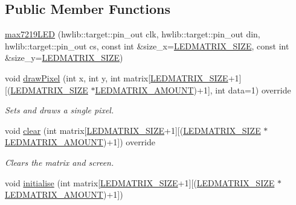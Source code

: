 \subsection*{Public Member Functions}
\begin{DoxyCompactItemize}
\item 
\hyperlink{classmax7219_l_e_d_a3f13dbd1dd54e3d3ce0148c1119273e5}{max7219\+L\+ED} (hwlib\+::target\+::pin\+\_\+out clk, hwlib\+::target\+::pin\+\_\+out din, hwlib\+::target\+::pin\+\_\+out cs, const int \&size\+\_\+x=\hyperlink{max7219_l_e_dconstants_8hpp_a2a4cf20d00f170bb1778318f645ab6cb}{L\+E\+D\+M\+A\+T\+R\+I\+X\+\_\+\+S\+I\+ZE}, const int \&size\+\_\+y=\hyperlink{max7219_l_e_dconstants_8hpp_a2a4cf20d00f170bb1778318f645ab6cb}{L\+E\+D\+M\+A\+T\+R\+I\+X\+\_\+\+S\+I\+ZE})
\item 
void \hyperlink{classmax7219_l_e_d_a6ce14869c58cf742e39e16620a4a724f}{draw\+Pixel} (int x, int y, int matrix\mbox{[}\hyperlink{max7219_l_e_dconstants_8hpp_a2a4cf20d00f170bb1778318f645ab6cb}{L\+E\+D\+M\+A\+T\+R\+I\+X\+\_\+\+S\+I\+ZE}+1\mbox{]}\mbox{[}(\hyperlink{max7219_l_e_dconstants_8hpp_a2a4cf20d00f170bb1778318f645ab6cb}{L\+E\+D\+M\+A\+T\+R\+I\+X\+\_\+\+S\+I\+ZE} $\ast$\hyperlink{max7219_l_e_dconstants_8hpp_aa3f1c3f51823e34beb0682e7f799793b}{L\+E\+D\+M\+A\+T\+R\+I\+X\+\_\+\+A\+M\+O\+U\+NT})+1\mbox{]}, int data=1) override
\begin{DoxyCompactList}\small\item\em Sets and draws a single pixel. \end{DoxyCompactList}\item 
void \hyperlink{classmax7219_l_e_d_a5ea755271f6306d1f0e97ec1f7c2c7c0}{clear} (int matrix\mbox{[}\hyperlink{max7219_l_e_dconstants_8hpp_a2a4cf20d00f170bb1778318f645ab6cb}{L\+E\+D\+M\+A\+T\+R\+I\+X\+\_\+\+S\+I\+ZE}+1\mbox{]}\mbox{[}(\hyperlink{max7219_l_e_dconstants_8hpp_a2a4cf20d00f170bb1778318f645ab6cb}{L\+E\+D\+M\+A\+T\+R\+I\+X\+\_\+\+S\+I\+ZE} $\ast$\hyperlink{max7219_l_e_dconstants_8hpp_aa3f1c3f51823e34beb0682e7f799793b}{L\+E\+D\+M\+A\+T\+R\+I\+X\+\_\+\+A\+M\+O\+U\+NT})+1\mbox{]}) override
\begin{DoxyCompactList}\small\item\em Clears the matrix and screen. \end{DoxyCompactList}\item 
void \hyperlink{classmax7219_l_e_d_abb0f536db36aa950bc189416d65db6a7}{initialise} (int matrix\mbox{[}\hyperlink{max7219_l_e_dconstants_8hpp_a2a4cf20d00f170bb1778318f645ab6cb}{L\+E\+D\+M\+A\+T\+R\+I\+X\+\_\+\+S\+I\+ZE}+1\mbox{]}\mbox{[}(\hyperlink{max7219_l_e_dconstants_8hpp_a2a4cf20d00f170bb1778318f645ab6cb}{L\+E\+D\+M\+A\+T\+R\+I\+X\+\_\+\+S\+I\+ZE} $\ast$\hyperlink{max7219_l_e_dconstants_8hpp_aa3f1c3f51823e34beb0682e7f799793b}{L\+E\+D\+M\+A\+T\+R\+I\+X\+\_\+\+A\+M\+O\+U\+NT})+1\mbox{]})

\end{DoxyCompactItemize}
